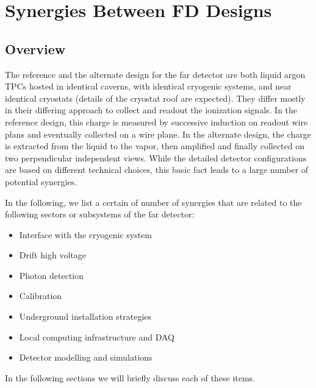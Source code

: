 \chapter{Synergies Between FD Designs}
\label{ch:detectors-synergy}

\section{Overview}

The reference and the alternate design for the far detector are both liquid argon TPCs hosted in identical caverns, with identical cryogenic systems, and near identical cryostats (details of the cryostat roof are expected). They differ mostly in their differing approach to collect and readout the ionization signals. In the reference design, this charge is measured by successive induction on readout wire plans and eventually collected on a wire plane. In the alternate design, the charge is extracted from the liquid to the vapor, then amplified and finally collected on two perpendicular independent views. While the detailed detector configurations are based on different technical choices, this basic fact leads to a large number of potential synergies. 

In the following, we list a certain of number of synergies that are related to the following sectors or subsystems of the far detector:
 
\begin{itemize}

\item Interface with the cryogenic system

\item Drift high voltage 

\item Photon detection

\item Calibration

\item Underground installation strategies

\item Local computing infrastructure and DAQ

\item Detector modelling and simulations

\end{itemize}

In the following sections we will briefly discuss each of these items. 
  


